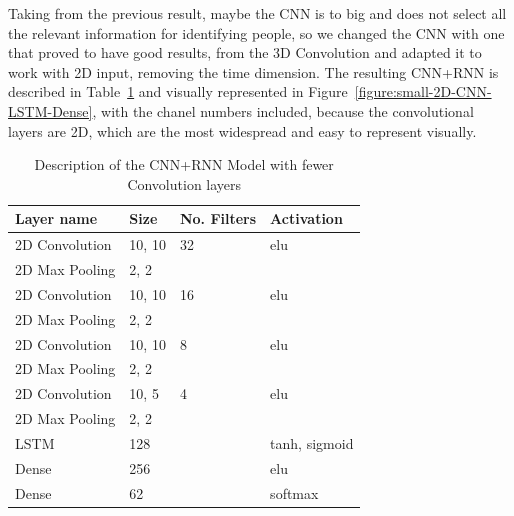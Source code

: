\documentclass[12pt]{article}
\theoremstyle{definition}
\begin{document}
	Taking from the previous result, maybe the CNN is to big and does not select all the relevant information for identifying people, so we changed the CNN with one that proved to have good results, from the 3D Convolution and adapted it to work with 2D input, removing the time dimension. The resulting CNN+RNN is described in Table~\ref{table:small-CNN-LSTM} and visually represented in Figure~\ref{figure:small-2D-CNN-LSTM-Dense}, with the chanel numbers included, because the convolutional layers are 2D, which are the most widespread and easy to represent visually.

	\begin{table}[ht]
		\centering
		\renewcommand{\arraystretch}{1.5}

		\caption{Description of the CNN+RNN Model with fewer Convolution layers}
		\label{table:small-CNN-LSTM}

		\begin{tabularx}{\textwidth}{XXXX}
			\textbf{Layer name} & \textbf{Size} & \textbf{No. Filters} & \textbf{Activation} \\ \hline
			2D Convolution & 10, 10 & 32                   & elu                  \\ \hline
			2D Max Pooling & 2, 2   & \textbf{\textendash} & \textbf{\textendash} \\ \hline
			2D Convolution & 10, 10 & 16                   & elu                  \\ \hline
			2D Max Pooling & 2, 2   & \textbf{\textendash} & \textbf{\textendash} \\ \hline
			2D Convolution & 10, 10 & 8                    & elu                  \\ \hline
			2D Max Pooling & 2, 2   & \textbf{\textendash} & \textbf{\textendash} \\ \hline
			2D Convolution & 10, 5  & 4                    & elu                  \\ \hline
			2D Max Pooling & 2, 2   & \textbf{\textendash} & \textbf{\textendash} \\ \hline
			LSTM           & 128    & \textbf{\textendash} & tanh, sigmoid        \\ \hline
			Dense          & 256    & \textbf{\textendash} & elu                  \\ \hline
			Dense          & 62     & \textbf{\textendash} & softmax              \\
		\end{tabularx}
	\end{table}
\end{document}
